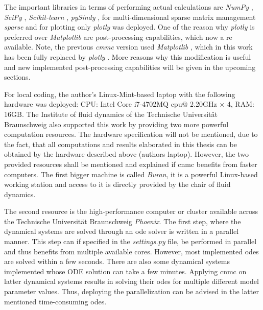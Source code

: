 The important libraries in terms of performing actual calculations are  
\emph{NumPy} \cite{harris2020array}, \emph{SciPy} \cite{2020SciPy-NMeth}, \emph{Scikit-learn} \cite{scikit-learn}, \emph{pySindy} \cite{Silva2020, Kaptanoglu2022}, for multi-dimensional sparse matrix management \emph{sparse} and for plotting only \emph{plotly} \cite{plotly} was deployed. One of the reason why \emph{plotly} is preferred over \emph{Matplotlib} \cite{Hunter:2007} are post-processing capabilities, which now a re available. Note, the previous \emph{\gls{cmm}c} version used \emph{Matplotlib} \cite{Hunter:2007}, which in this work has been fully replaced by \emph{plotly} \cite{plotly}. More reasons why this modification is useful and new implemented post-processing capabilities will be given in the upcoming sections.\newline

For local coding, the author's Linux-Mint-based laptop with the following hardware was deployed: CPU: Intel Core i7-4702MQ \gls{cpu}@ 2.20GHz × 4, RAM: 16GB.
The Institute of fluid dynamics of the Technische Universität Braunschweig 
also supported this work by providing two more powerful computation resources.
The hardware specification will not be mentioned, due to the fact, that all computations and results elaborated in this thesis can be obtained by 
the hardware described above (authors laptop). However, the two provided 
resources shall be mentioned and explained if \gls{cnmc} benefits from 
faster computers. The first bigger machine is called \emph{Buran}, it is a 
powerful Linux-based working station and access to it is directly provided by 
the chair of fluid dynamics. \newline 

The second resource is the high-performance 
computer or cluster available across the Technische Universität Braunschweig 
\emph{Phoenix}. The first step, where the dynamical systems are solved through an \gls{ode} solver 
is written in a parallel manner. This step can if specified in the \emph{settings.py} file, be performed in parallel and thus benefits from 
multiple available cores. However, most implemented \gls{ode}s are solved within 
a few seconds. There are also some dynamical systems implemented whose
ODE solution can take a few minutes. Applying \gls{cnmc} on latter dynamical 
systems results in solving their \gls{ode}s for multiple different model parameter values. Thus, deploying the parallelization can be advised in the latter mentioned time-consuming \gls{ode}s.\newline 

